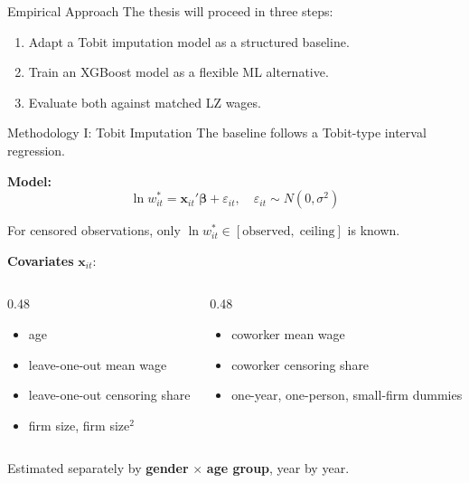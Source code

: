 \documentclass[10pt]{beamer}
\begin{document}
\begin{frame}{Empirical Approach}
The thesis will proceed in three steps:
\begin{enumerate}
    \item Adapt a Tobit imputation model as a structured baseline.
    \item Train an XGBoost model as a flexible ML alternative.
    \item Evaluate both against matched LZ wages.
\end{enumerate}
\end{frame}

\begin{frame}{Methodology I: Tobit Imputation}
The baseline follows a Tobit-type interval regression.

\vspace{0.2cm}
\textbf{Model:}
\[
\ln w_{it}^{*} = \mathbf{x}_{it}' \boldsymbol{\beta} + \varepsilon_{it}, \quad \varepsilon_{it} \sim N(0, \sigma^2)
\]

For censored observations, only $\ln w_{it}^{*} \in [\text{observed}, \; \text{ceiling}]$ is known. %

\vspace{0.2cm}
\textbf{Covariates} $\mathbf{x}_{it}$:
\begin{columns}[T]
\begin{column}{0.48\textwidth}
\begin{itemize}
    \item age
    \item leave-one-out mean wage
    \item leave-one-out censoring share
    \item firm size, firm size$^2$
\end{itemize}
\end{column}
\begin{column}{0.48\textwidth}
\begin{itemize}
    \item coworker mean wage
    \item coworker censoring share
    \item one-year, one-person, small-firm dummies
\end{itemize}
\end{column}
\end{columns}

\vspace{0.2cm}
Estimated separately by \textbf{gender} $\times$ \textbf{age group}, year by year.
\end{frame}
\end{document}
